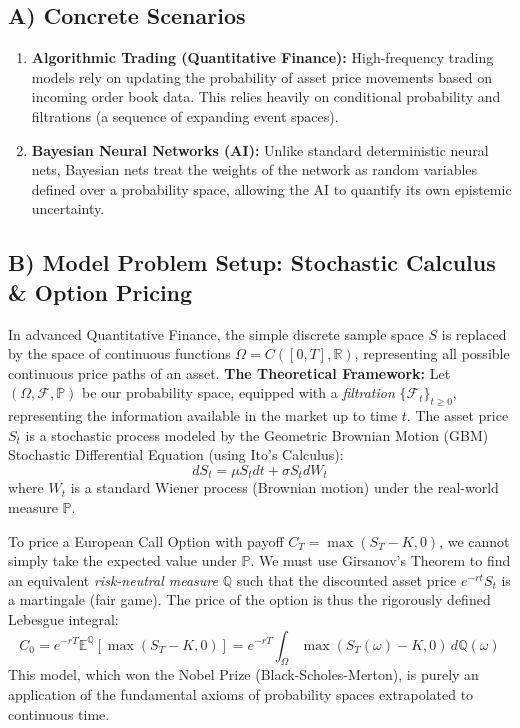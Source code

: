 \documentclass[11pt]{article}
\begin{document}
\subsection{A) Concrete Scenarios}
\begin{enumerate}
    \item \textbf{Algorithmic Trading (Quantitative Finance):} High-frequency trading models rely on updating the probability of asset price movements based on incoming order book data. This relies heavily on conditional probability and filtrations (a sequence of expanding event spaces).
    \item \textbf{Bayesian Neural Networks (AI):} Unlike standard deterministic neural nets, Bayesian nets treat the weights of the network as random variables defined over a probability space, allowing the AI to quantify its own epistemic uncertainty.
\end{enumerate}

\subsection{B) Model Problem Setup: Stochastic Calculus \& Option Pricing}
In advanced Quantitative Finance, the simple discrete sample space $S$ is replaced by the space of continuous functions $\Omega = C([0,T], \mathbb{R})$, representing all possible continuous price paths of an asset.
\newline\newline
\textbf{The Theoretical Framework:}
Let $(\Omega, \mathcal{F}, \mathbb{P})$ be our probability space, equipped with a \textit{filtration} $\{\mathcal{F}_t\}_{t \ge 0}$, representing the information available in the market up to time $t$. The asset price $S_t$ is a stochastic process modeled by the Geometric Brownian Motion (GBM) Stochastic Differential Equation (using Ito's Calculus):
\[ dS_t = \mu S_t dt + \sigma S_t dW_t \]
where $W_t$ is a standard Wiener process (Brownian motion) under the real-world measure $\mathbb{P}$. 

To price a European Call Option with payoff $C_T = \max(S_T - K, 0)$, we cannot simply take the expected value under $\mathbb{P}$. We must use Girsanov's Theorem to find an equivalent \textit{risk-neutral measure} $\mathbb{Q}$ such that the discounted asset price $e^{-rt}S_t$ is a martingale (fair game). The price of the option is thus the rigorously defined Lebesgue integral:
\[ C_0 = e^{-rT} \mathbb{E}^{\mathbb{Q}}[ \max(S_T - K, 0) ] = e^{-rT} \int_{\Omega} \max(S_T(\omega) - K, 0) \, d\mathbb{Q}(\omega) \]
This model, which won the Nobel Prize (Black-Scholes-Merton), is purely an application of the fundamental axioms of probability spaces extrapolated to continuous time.
\end{document}
